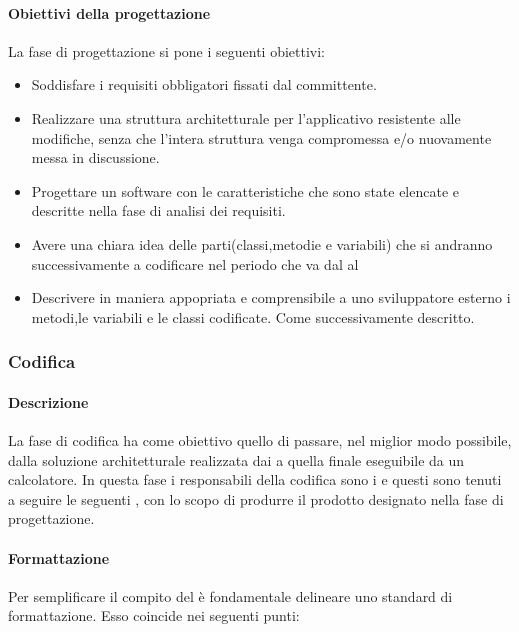 \paragraph{Obiettivi della progettazione}
La fase di progettazione si pone i seguenti obiettivi:
\begin{itemize}
\item Soddisfare i requisiti obbligatori fissati dal committente.
\item Realizzare una struttura architetturale per l'applicativo  resistente alle modifiche, senza che l'intera struttura venga compromessa e/o nuovamente messa in discussione.
\item Progettare un software con le caratteristiche che sono state elencate e descritte nella fase di analisi dei requisiti.
\item Avere una chiara idea delle parti(classi,metodie e variabili) che si andranno successivamente a codificare nel periodo che va dal \RP al \RQ
\item Descrivere in maniera appopriata e comprensibile a uno sviluppatore esterno i metodi,le variabili e le classi codificate. Come successivamente descritto.
\end{itemize}

\subsubsection{Codifica}
\paragraph{Descrizione}
La fase di codifica ha come obiettivo quello di passare, nel miglior modo possibile, dalla soluzione architetturale realizzata dai \textit{\ProgP} a quella finale eseguibile da un calcolatore.
In questa fase i responsabili della codifica sono i \textit{\ProgrP} e questi sono tenuti a seguire le seguenti , con lo scopo di produrre il prodotto designato nella fase di progettazione.

\paragraph{Formattazione}
Per semplificare il compito del \textit{\Prog} è fondamentale delineare uno standard di formattazione.
Esso coincide nei seguenti punti:

